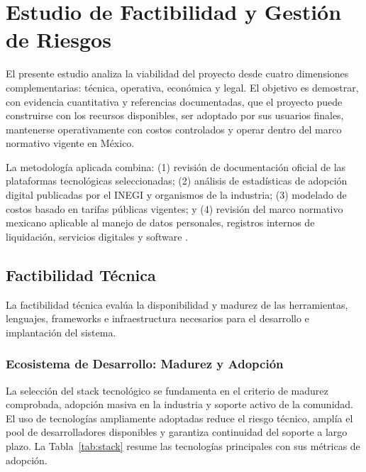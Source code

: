 \section{Estudio de Factibilidad y Gestión de Riesgos}

El presente estudio analiza la viabilidad del proyecto desde cuatro dimensiones
complementarias: técnica, operativa, económica y legal. El objetivo es demostrar,
con evidencia cuantitativa y referencias documentadas, que el proyecto puede
construirse con los recursos disponibles, ser adoptado por sus usuarios finales,
mantenerse operativamente con costos controlados y operar dentro del marco
normativo vigente en México.

La metodología aplicada combina: (1) revisión de documentación oficial de las
plataformas tecnológicas seleccionadas; (2) análisis de estadísticas de adopción
digital publicadas por el INEGI y organismos de la industria; (3) modelado de
costos basado en tarifas públicas vigentes; y (4) revisión del marco normativo
mexicano aplicable al manejo de datos personales, registros internos de liquidación,
servicios digitales y software \cite{nextjs, supabase_pricing, prisma_docs, state_of_js_2023, stackoverflow_2023_results}.

\FloatBarrier
\subsection{Factibilidad Técnica}

La factibilidad técnica evalúa la disponibilidad y madurez de las herramientas,
lenguajes, frameworks e infraestructura necesarios para el desarrollo e implantación
del sistema.

\subsubsection{Ecosistema de Desarrollo: Madurez y Adopción}

La selección del stack tecnológico se fundamenta en el criterio de madurez
comprobada, adopción masiva en la industria y soporte activo de la comunidad.
El uso de tecnologías ampliamente adoptadas reduce el riesgo técnico, amplía el
pool de desarrolladores disponibles y garantiza continuidad del soporte a largo
plazo. La Tabla~\ref{tab:stack} resume las tecnologías principales con sus métricas
de adopción.

